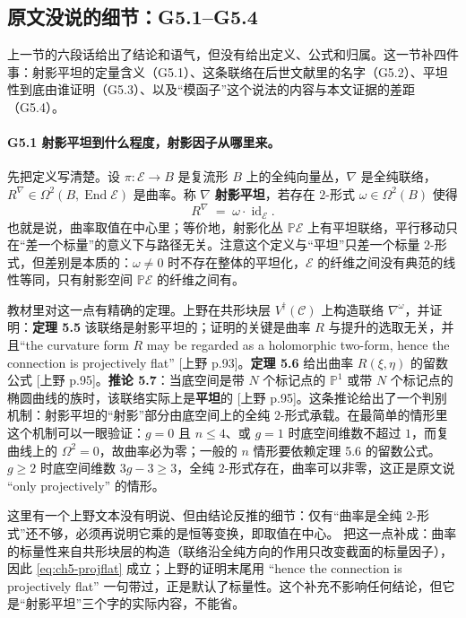 \subsection{原文没说的细节：G5.1--G5.4}
\label{sec:ch5-gaps}

上一节的六段话给出了结论和语气，但没有给出定义、公式和归属。这一节补四件事：射影平坦的定量含义（G5.1）、这条联络在后世文献里的名字（G5.2）、平坦性到底由谁证明（G5.3）、以及“模函子”这个说法的内容与本文证据的差距（G5.4）。

\paragraph{G5.1 射影平坦到什么程度，射影因子从哪里来。}先把定义写清楚。设 $\pi:\mathcal{E}\to B$ 是复流形 $B$ 上的全纯向量丛，$\nabla$ 是全纯联络，$R^\nabla\in\Omega^2(B,\operatorname{End}\mathcal{E})$ 是曲率。称 $\nabla$ \textbf{射影平坦}，若存在 $2$-形式 $\omega\in\Omega^2(B)$ 使得
\begin{equation}
R^\nabla \;=\; \omega\cdot\operatorname{id}_{\mathcal{E}}.
\label{eq:ch5-projflat}
\end{equation}
也就是说，曲率取值在中心里；等价地，射影化丛 $\mathbb P\mathcal{E}$ 上有平坦联络，平行移动只在“差一个标量”的意义下与路径无关。注意这个定义与“平坦”只差一个标量 $2$-形式，但差别是本质的：$\omega\neq0$ 时不存在整体的平坦化，$\mathcal{E}$ 的纤维之间没有典范的线性等同，只有射影空间 $\mathbb P\mathcal{E}$ 的纤维之间有。

教材里对这一点有精确的定理。上野在共形块层 $V^\dagger(\mathcal C)$ 上构造联络 $\nabla^\omega$，并证明：\textbf{定理 5.5} 该联络是射影平坦的；证明的关键是曲率 $R$ 与提升的选取无关，并且“the curvature form $R$ may be regarded as a holomorphic two-form, hence the connection is projectively flat” [上野 p.93]。\textbf{定理 5.6} 给出曲率 $R(\xi,\eta)$ 的留数公式 [上野 p.95]。\textbf{推论 5.7}：当底空间是带 $N$ 个标记点的 $\mathbb P^1$ 或带 $N$ 个标记点的椭圆曲线的族时，该联络实际上是\textbf{平坦}的 [上野 p.95]。这条推论给出了一个判别机制：射影平坦的“射影”部分由底空间上的全纯 $2$-形式承载。在最简单的情形里这个机制可以一眼验证：$g=0$ 且 $n\le4$、或 $g=1$ 时底空间维数不超过 $1$，而复曲线上的 $\Omega^2=0$，故曲率必为零；一般的 $n$ 情形要依赖定理 5.6 的留数公式。$g\ge2$ 时底空间维数 $3g-3\ge3$，全纯 $2$-形式存在，曲率可以非零，这正是原文说 “only projectively” 的情形。

这里有一个上野文本没有明说、但由结论反推的细节：仅有“曲率是全纯 $2$-形式”还不够，必须再说明它乘的是恒等变换，即取值在中心。\ours{} 把这一点补成：曲率的标量性来自共形块层的构造（联络沿全纯方向的作用只改变截面的标量因子），因此 \eqref{eq:ch5-projflat} 成立；上野的证明末尾用 “hence the connection is projectively flat” 一句带过，正是默认了标量性。这个补充不影响任何结论，但它是“射影平坦”三个字的实际内容，不能省。

